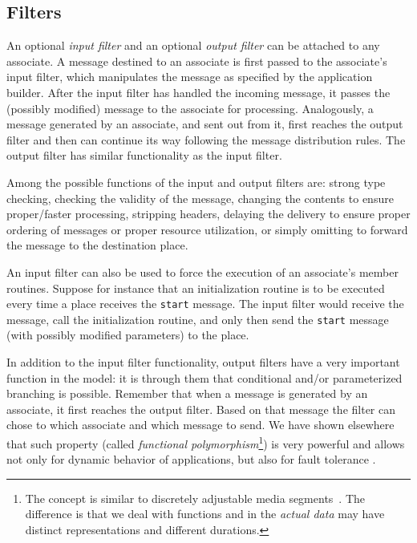 \documentclass[twocolumn,10pt]{article}
\newcommand{\event}[1]{{\tt #1}}
\begin{document}
\subsection{Filters}

An optional {\em input filter} and an optional {\em output filter} can
be attached to any associate.  A message destined to an associate is
first passed to the associate's input filter, which manipulates the
message as specified by the application builder.  After the input
filter has handled the incoming message, it passes the (possibly
modified) message to the associate for processing.  Analogously, a
message generated by an associate, and sent out from it, first reaches
the output filter and then can continue its way following the message
distribution rules.  The output filter has similar functionality as
the input filter.

Among the possible functions of the input and output filters are:
strong type checking, checking the validity of the message,
changing the contents to ensure proper/faster processing, stripping
headers, delaying the delivery to ensure proper ordering of messages
or proper resource utilization, or simply omitting to forward the
message to the destination place.

An input filter can also be used to force the execution of an
associate's member routines.  Suppose for instance that an
initialization routine is to be executed every time a place receives
the \event{start} message.  The input filter would receive the message,
call the initialization routine, and only then send the
\event{start} message (with possibly modified parameters) to the
place.

In addition to the input filter functionality, output filters have a
very important function in the model: it is through them that
conditional and/or parameterized branching is possible.  Remember that
when a message is generated by an associate, it first reaches the
output filter.  Based on that message the filter can chose to which
associate and which message to send.  We have shown elsewhere that
such property (called {\em functional polymorphism}\footnote{The
concept is similar to discretely adjustable media
segments~\cite{buc:tempLayout}.  The difference is that we deal with
functions and in \cite{buc:tempLayout} the {\em actual data} may have distinct
representations and different durations.}) is very powerful and
allows not only for dynamic behavior of applications, but also for
fault tolerance \cite{mos:obrt}.
\end{document}
